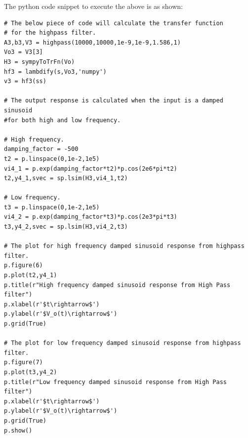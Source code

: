 \documentclass[11pt, a4paper]{article}
\begin{document}
The python code snippet to execute the above is as shown:
\begin{verbatim}
# The below piece of code will calculate the transfer function
# for the highpass filter.
A3,b3,V3 = highpass(10000,10000,1e-9,1e-9,1.586,1)
Vo3 = V3[3]
H3 = sympyToTrFn(Vo)
hf3 = lambdify(s,Vo3,'numpy')
v3 = hf3(ss)

# The output response is calculated when the input is a damped sinusoid 
#for both high and low frequency.

# High frequency.
damping_factor = -500
t2 = p.linspace(0,1e-2,1e5) 
vi4_1 = p.exp(damping_factor*t2)*p.cos(2e6*pi*t2)
t2,y4_1,svec = sp.lsim(H3,vi4_1,t2)

# Low frequency.
t3 = p.linspace(0,1e-2,1e5)
vi4_2 = p.exp(damping_factor*t3)*p.cos(2e3*pi*t3)
t3,y4_2,svec = sp.lsim(H3,vi4_2,t3)

# The plot for high frequency damped sinusoid response from highpass filter.
p.figure(6)
p.plot(t2,y4_1)
p.title(r"High frequency damped sinusoid response from High Pass filter")
p.xlabel(r'$t\rightarrow$')
p.ylabel(r'$V_o(t)\rightarrow$')
p.grid(True)

# The plot for low frequency damped sinusoid response from highpass filter.
p.figure(7)
p.plot(t3,y4_2)
p.title(r"Low frequency damped sinusoid response from High Pass filter")
p.xlabel(r'$t\rightarrow$')
p.ylabel(r'$V_o(t)\rightarrow$')
p.grid(True)
p.show()	
\end{verbatim}
\end{document}

